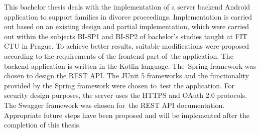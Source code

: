 This bachelor thesis deals with the implementation of a server backend Android application to support families in divorce proceedings. Implementation is carried out based on an existing design and partial implementation, which were carried out within the subjects BI-SP1 and BI-SP2 of bachelor's studies taught at FIT CTU in Prague. To achieve better results, suitable modifications were proposed according to the requirements of the frontend part of~the application. The backend application is written in the Kotlin language. The~Spring framework was chosen to design the REST API. The JUnit 5 frameworks and the functionality provided by the Spring framework were chosen to~test the application. For security design purposes, the server uses the HTTPS and OAuth 2.0 protocols. The Swagger framework was chosen for~the REST API documentation. Appropriate future steps have been proposed and will be implemented after the completion of this thesis.